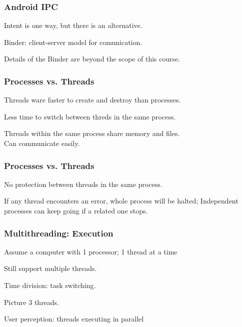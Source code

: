 \begin{frame}
\frametitle{Android IPC}
\begin{changemargin}{1cm}
Intent is one way, but there is an alternative.

\alert{Binder}: client-server model for comunication.

Details of the Binder are beyond the scope of this course.

\end{changemargin}
\end{frame}


\begin{frame}
\frametitle{Processes vs. Threads}
\begin{changemargin}{1cm}
Threads ware faster to create and destroy than processes.

Less time to switch between threds in the same process.

Threads within the same process share memory and files.\\
\quad Can communicate easily.

\end{changemargin}
\end{frame}

\begin{frame}
\frametitle{Processes vs. Threads}
\begin{changemargin}{1cm}
No protection between threads in the same process.

If any thread encounters an error, whole process will be halted;
\quad Independent processes can keep going if a related one stops.

\end{changemargin}
\end{frame}


\begin{frame}
\frametitle{Multithreading: Execution}
\begin{changemargin}{1cm}
Assume a computer with 1 processor; 1 thread at a time

Still support multiple threads.

Time division: task switching.

Picture 3 threads. 

User perception: threads executing in parallel 


\end{changemargin}
\end{frame}


